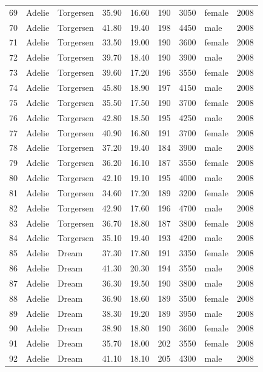 \documentclass{article}\usepackage[]{graphicx}\usepackage[]{xcolor}
\begin{document}
\begin{table}[ht]
\begin{tabular}{rllrrrrlr}
  69 & Adelie & Torgersen & 35.90 & 16.60 & 190 & 3050 & female & 2008 \\ 
  70 & Adelie & Torgersen & 41.80 & 19.40 & 198 & 4450 & male & 2008 \\ 
  71 & Adelie & Torgersen & 33.50 & 19.00 & 190 & 3600 & female & 2008 \\ 
  72 & Adelie & Torgersen & 39.70 & 18.40 & 190 & 3900 & male & 2008 \\ 
  73 & Adelie & Torgersen & 39.60 & 17.20 & 196 & 3550 & female & 2008 \\ 
  74 & Adelie & Torgersen & 45.80 & 18.90 & 197 & 4150 & male & 2008 \\ 
  75 & Adelie & Torgersen & 35.50 & 17.50 & 190 & 3700 & female & 2008 \\ 
  76 & Adelie & Torgersen & 42.80 & 18.50 & 195 & 4250 & male & 2008 \\ 
  77 & Adelie & Torgersen & 40.90 & 16.80 & 191 & 3700 & female & 2008 \\ 
  78 & Adelie & Torgersen & 37.20 & 19.40 & 184 & 3900 & male & 2008 \\ 
  79 & Adelie & Torgersen & 36.20 & 16.10 & 187 & 3550 & female & 2008 \\ 
  80 & Adelie & Torgersen & 42.10 & 19.10 & 195 & 4000 & male & 2008 \\ 
  81 & Adelie & Torgersen & 34.60 & 17.20 & 189 & 3200 & female & 2008 \\ 
  82 & Adelie & Torgersen & 42.90 & 17.60 & 196 & 4700 & male & 2008 \\ 
  83 & Adelie & Torgersen & 36.70 & 18.80 & 187 & 3800 & female & 2008 \\ 
  84 & Adelie & Torgersen & 35.10 & 19.40 & 193 & 4200 & male & 2008 \\ 
  85 & Adelie & Dream & 37.30 & 17.80 & 191 & 3350 & female & 2008 \\ 
  86 & Adelie & Dream & 41.30 & 20.30 & 194 & 3550 & male & 2008 \\ 
  87 & Adelie & Dream & 36.30 & 19.50 & 190 & 3800 & male & 2008 \\ 
  88 & Adelie & Dream & 36.90 & 18.60 & 189 & 3500 & female & 2008 \\ 
  89 & Adelie & Dream & 38.30 & 19.20 & 189 & 3950 & male & 2008 \\ 
  90 & Adelie & Dream & 38.90 & 18.80 & 190 & 3600 & female & 2008 \\ 
  91 & Adelie & Dream & 35.70 & 18.00 & 202 & 3550 & female & 2008 \\ 
  92 & Adelie & Dream & 41.10 & 18.10 & 205 & 4300 & male & 2008 \\ 

\end{tabular}
\end{table}
\end{document}
